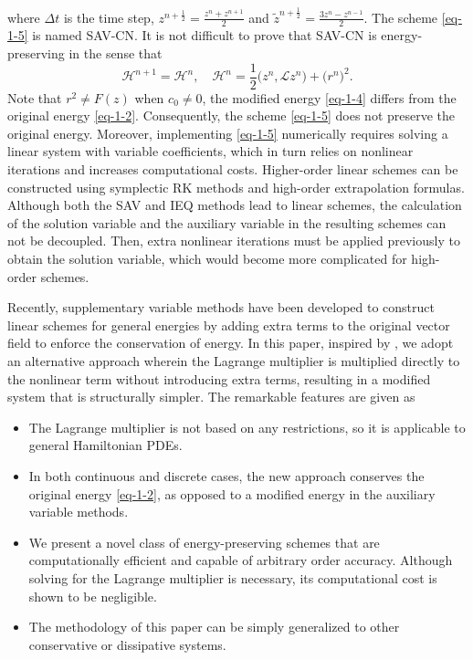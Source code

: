 \documentclass[onefignum,onetabnum]{siamart}
\begin{document}
where $\Delta t$ is the time step, $z^{n+\frac{1}{2}}=\frac{z^n+z^{n+1}}{2}$ and $\tilde{z}^{n+\frac{1}{2}}=\frac{3z^n-z^{n-1}}{2}$. The scheme \eqref{eq-1-5} is named SAV-CN. It is not difficult to prove that SAV-CN is energy-preserving in the sense that 
\begin{equation}\label{eq-1-6}
	\mathcal{H}^{n+1}=\mathcal{H}^n,\quad\mathcal{H}^n=\frac{1}{2}\big(z^n,\mathcal{L}z^n\big)+\big(r^n\big)^2.
\end{equation}
Note that $r^2\neq F(z)$ when $c_0\neq 0$, the modified energy \eqref{eq-1-4} differs from the original energy \eqref{eq-1-2}. Consequently, the scheme \eqref{eq-1-5} does not preserve the original energy. Moreover, implementing \eqref{eq-1-5} numerically requires solving a linear system with variable coefficients, which in turn relies on nonlinear iterations and increases computational costs. Higher-order linear schemes \cite{akrivis-19-RK-SAV-SIAMJSC,bo-22-ESAV-NA,feng-21-SAV-Gauss-SINA,li-20-linear-high-order-SAV-NLW-JSC,li-21-high-order-SAV-NLS-JSC} can be constructed using symplectic RK methods and high-order extrapolation formulas. Although both the SAV and IEQ methods lead to linear schemes, the calculation of the solution variable and the auxiliary variable in the resulting schemes can not be decoupled. Then, extra nonlinear iterations must be applied previously to obtain the solution variable, which would become more complicated for high-order schemes. 

Recently, supplementary variable methods \cite{gong-21-SVM-CMAME} have been developed to construct linear schemes for general energies by adding extra terms to the original vector field to enforce the conservation of energy. In this paper, inspired by \cite{cheng-20-LM-CMAME}, we adopt an alternative approach wherein the Lagrange multiplier is multiplied directly to the nonlinear term without introducing extra terms, resulting in a modified system that is structurally simpler. The remarkable features are given as
\begin{itemize}
	\item[{i.}] The Lagrange multiplier is not based on any restrictions, so it is applicable to general Hamiltonian PDEs.
	\item[{ii.}] In both continuous and discrete cases, the new approach conserves the original energy \eqref{eq-1-2}, as opposed to a modified energy in the auxiliary variable methods.
	\item[{iii.}] We present a novel class of energy-preserving schemes that are computationally efficient and capable of arbitrary order accuracy. Although solving for the Lagrange multiplier is necessary, its computational cost is shown to be negligible.
	\item[{iv.}] The methodology of this paper can be simply generalized to other conservative or dissipative systems.
\end{itemize}
\end{document}
